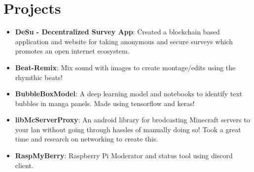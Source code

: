 \documentclass[letterpaper,11pt]{article}
\newcommand{\resumeItem}[2]{
  \item\small{
    \textbf{#1}{: #2 \vspace{-2pt}}
  }
}
\newcommand{\resumeSubItem}[2]{\resumeItem{#1}{#2}\vspace{-4pt}}
\newcommand{\resumeSubHeadingListStart}{\begin{itemize}[leftmargin=*]}
\newcommand{\resumeSubHeadingListEnd}{\end{itemize}}
\begin{document}
\section{Projects}
  \resumeSubHeadingListStart
    \resumeSubItem{DeSu - Decentralized Survey App}
      {Created a blockchain based application and website for taking anonymous and secure surveys which promotes an open internet ecosystem.}
    \resumeSubItem{Beat-Remix}
      {Mix sound with images to create montage/edits using the rhymthic beats!}
    \resumeSubItem{BubbleBoxModel}
      {A deep learning model and notebooks to identify text bubbles in manga panels. Made using tensorflow and keras!}
    \resumeSubItem{libMcServerProxy}
      {An android library for brodcasting Minecraft servers to your lan without going through hassles of manually doing so! Took a great time and research on networking to create this.}
    \resumeSubItem{RaspMyBerry}
      {Raspberry Pi Moderator and status tool using discord client.}

  \resumeSubHeadingListEnd

%


\end{document}
